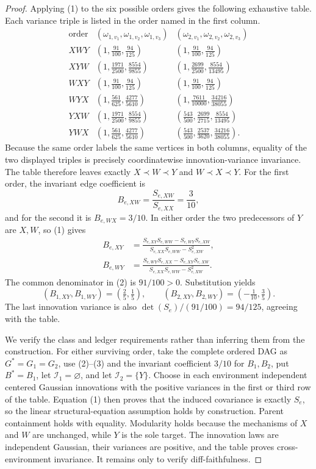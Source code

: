 \documentclass{article}
\begin{document}
\begin{proof}
Applying (1) to the six possible orders gives the following exhaustive table. Each variance triple is listed in the order named in the first column.
\[
\begin{array}{c|c|c}
 \text{order}&(\omega_{1,v_1},\omega_{1,v_2},\omega_{1,v_3})
             &(\omega_{2,v_1},\omega_{2,v_2},\omega_{2,v_3})\\ \hline
 XWY&(1,\frac{91}{100},\frac{94}{125})
     &(1,\frac{91}{100},\frac{94}{125})\\
 XYW&(1,\frac{1971}{2500},\frac{8554}{9855})
     &(1,\frac{2699}{2500},\frac{8554}{13495})\\
 WXY&(1,\frac{91}{100},\frac{94}{125})
     &(1,\frac{91}{100},\frac{94}{125})\\
 WYX&(1,\frac{561}{625},\frac{4277}{5610})
     &(1,\frac{7611}{10000},\frac{34216}{38055})\\
 YXW&(1,\frac{1971}{2500},\frac{8554}{9855})
     &(\frac{543}{500},\frac{2699}{2715},\frac{8554}{13495})\\
 YWX&(1,\frac{561}{625},\frac{4277}{5610})
     &(\frac{543}{500},\frac{2537}{3620},\frac{34216}{38055}).
\end{array}
\]
Because the same order labels the same vertices in both columns, equality of the two displayed triples is precisely coordinatewise innovation-variance invariance. The table therefore leaves exactly \(X\prec W\prec Y\) and \(W\prec X\prec Y\). For the first order, the invariant edge coefficient is
\[
 B_{e,XW}=\frac{S_{e,XW}}{S_{e,XX}}=\frac3{10},
\]
and for the second it is \(B_{e,WX}=3/10\). In either order the two predecessors of \(Y\) are \(X,W\), so (1) gives
\[
\begin{split}
 B_{e,XY}
 &=\frac{S_{e,XY}S_{e,WW}-S_{e,WY}S_{e,XW}}
         {S_{e,XX}S_{e,WW}-S_{e,XW}^2},\\
 B_{e,WY}
 &=\frac{S_{e,WY}S_{e,XX}-S_{e,XY}S_{e,XW}}
         {S_{e,XX}S_{e,WW}-S_{e,XW}^2}.
\end{split}
\tag{2}
\]
The common denominator in (2) is \(91/100>0\). Substitution yields
\[
 (B_{1,XY},B_{1,WY})=(\tfrac25,\tfrac15),
 \qquad
 (B_{2,XY},B_{2,WY})=(-\tfrac1{10},\tfrac35).
 \tag{3}
\]
The last innovation variance is also \(\det(S_e)/(91/100)=94/125\), agreeing with the table.

We verify the class and ledger requirements rather than inferring them from the construction. For either surviving order, take the complete ordered DAG as \(G^*=G_1=G_2\), use (2)--(3) and the invariant coefficient \(3/10\) for \(B_1,B_2\), put \(B^*=B_1\), let \(\mathcal I_1=\varnothing\), and let \(\mathcal I_2=\{Y\}\). Choose in each environment independent centered Gaussian innovations with the positive variances in the first or third row of the table. Equation (1) then proves that the induced covariance is exactly \(S_e\), so the linear structural-equation assumption holds by construction. Parent containment holds with equality. Modularity holds because the mechanisms of \(X\) and \(W\) are unchanged, while \(Y\) is the sole target. The innovation laws are independent Gaussian, their variances are positive, and the table proves cross-environment invariance. It remains only to verify diff-faithfulness.


\end{proof}
\end{document}
